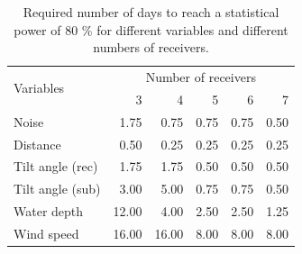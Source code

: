 \documentclass[doublespacing,linenumbers]{bmcart}
\begin{document}
\begin{backmatter}
\begin{table}[]
\centering
\caption{Required number of days to reach a statistical power of 80 \% for different variables and different numbers of receivers.}
\begin{tabular}{lrrrrr}
\hline
\multirow{2}{*}{Variables} & \multicolumn{5}{c}{Number of receivers} \\ 
                           & 3       & 4       & 5     & 6     & 7     \\ \hline
Noise                      & 1.75    & 0.75    & 0.75  & 0.75  & 0.50  \\
Distance                   & 0.50    & 0.25    & 0.25  & 0.25  & 0.25  \\
Tilt angle   (rec)         & 1.75    & 1.75    & 0.50  & 0.50  & 0.50  \\
Tilt angle   (sub)         & 3.00    & 5.00    & 0.75  & 0.75  & 0.50  \\
Water depth                & 12.00   & 4.00    & 2.50  & 2.50  & 1.25  \\
Wind speed                 & 16.00   & 16.00   & 8.00  & 8.00  & 8.00  \\ \hline
\end{tabular}
\label{tab:power}
\end{table}


    



\end{backmatter}
\end{document}
